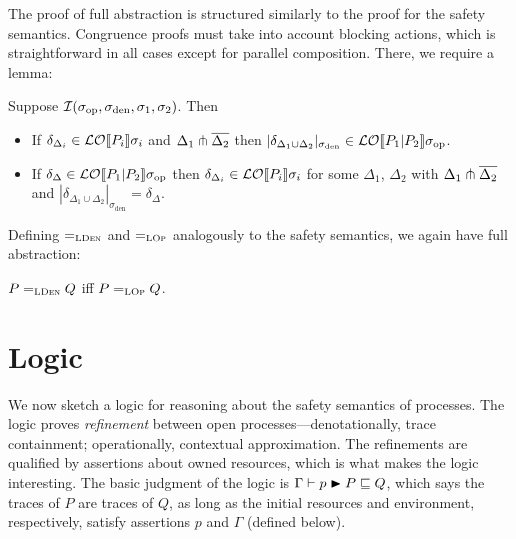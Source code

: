 \documentclass{entcs}
\begin{document}
The proof of full abstraction is structured similarly to the proof for
the safety semantics.  Congruence proofs must take into account
blocking actions, which is straightforward in all cases except for
parallel composition.  There, we require a lemma:

\begin{lemma}
Suppose $\mathcal{I}(\sigma_{\textrm{op}}, \sigma_{\textrm{den}}, \sigma_1, \sigma_2)$.  Then
\begin{itemize}
\item If $\delta_{\Delta_i} \in \mathcal{LO}\!\left\llbracket P_i \right\rrbracket \! \sigma_i$ and $\Delta_1
  \pitchfork \overline{\Delta_2}$ then $|\delta_{\Delta_1 \cup \Delta_2}|_{\sigma_{\textrm{den}}} \in
  \mathcal{LO}\!\left\llbracket P_1|P_2 \right\rrbracket \! \sigma_{\textrm{op}}$.
\item If $\delta_\Delta \in \mathcal{LO}\!\left\llbracket P_1|P_2 \right\rrbracket \! \sigma_{\textrm{op}}$ then
  $\delta_{\Delta_i} \in \mathcal{LO}\!\left\llbracket P_i \right\rrbracket \! \sigma_i$ for some $\Delta_1$,
  $\Delta_2$ with $\Delta_1 \pitchfork \overline{\Delta_2}$ and
  $|\delta_{\Delta_1 \cup \Delta_2}|_{\sigma_{\textrm{den}}} =
  \delta_\Delta$.
\end{itemize}
\end{lemma}

Defining $=_{\textsc{LDen}}$ and $=_{\textsc{LOp}}$ analogously to the
safety semantics, we again have full abstraction:
\begin{theorem}
  $P =_{\textsc{LDen}} Q$ iff $P =_{\textsc{LOp}} Q$.
\end{theorem}

\section{Logic}
\label{sec:logic}

We now sketch a logic for reasoning about the safety semantics of
processes.  The logic proves \emph{refinement} between open
processes---denotationally, trace containment; operationally,
contextual approximation.  The refinements are qualified by assertions
about owned resources, which is what makes the logic interesting.  The
basic judgment of the logic is $\Gamma \vdash p \blacktriangleright P \sqsubseteq Q$,
which says the traces of $P$ are traces of $Q$, as long as the initial
resources and environment, respectively, satisfy assertions $p$ and $\Gamma$ (defined below).
\end{document}
